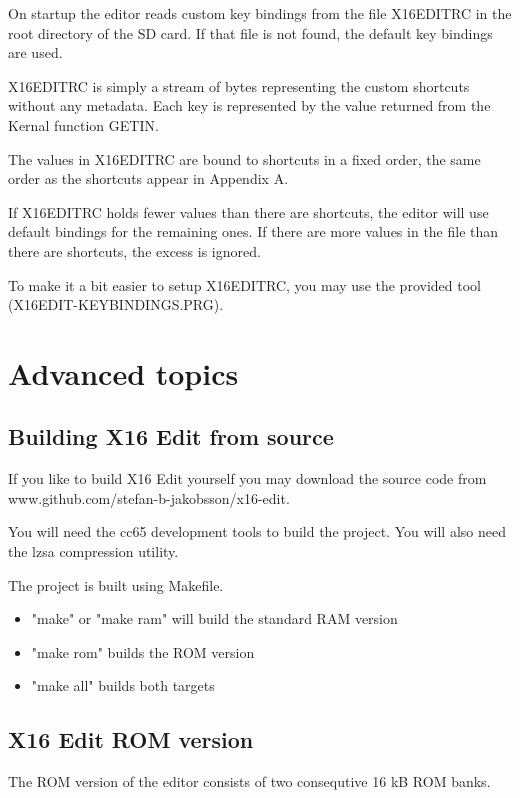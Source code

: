 \documentclass{article}
\begin{document}
        On startup the editor reads custom key bindings from the file X16EDITRC in the root directory
        of the SD card. If that file is not found, the default key bindings are
        used.
        
        X16EDITRC is simply a stream of bytes representing the custom shortcuts without any metadata. 
        Each key is represented by the value returned from the Kernal function GETIN.
        
        The values in X16EDITRC are bound to shortcuts in a fixed order, the same order as
        the shortcuts appear in Appendix A.
        
        If X16EDITRC holds fewer values than there are shortcuts, the editor will use
        default bindings for the remaining ones. If there are more values in the file than there
        are shortcuts, the excess is ignored.
        
        To make it a bit easier to setup X16EDITRC, you may use the provided tool
        (X16EDIT-KEYBINDINGS.PRG).

\section{Advanced topics}

    \subsection{Building X16 Edit from source}
        If you like to build X16 Edit yourself you may download the source code from
        www.github.com/stefan-b-jakobsson/x16-edit.

        You will need the cc65 development tools to build the project. You will also need the lzsa compression utility.

        The project is built using Makefile.

        \begin{itemize}
            \item "make" or "make ram" will build the standard RAM version
            \item "make rom" builds the ROM version
            \item "make all" builds both targets
        \end{itemize}

    \subsection{X16 Edit ROM version}
        The ROM version of the editor consists of two consequtive 16 kB ROM banks.
\end{document}
